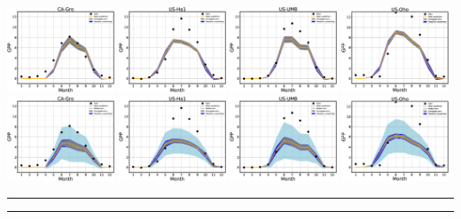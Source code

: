 \begin{center}
\includegraphics[width=0.24\textwidth]{figs_local/fit_CA-Gro.eps}
\includegraphics[width=0.24\textwidth]{figs_local/fit_US-Ha1.eps}
\includegraphics[width=0.24\textwidth]{figs_local/fit_US-UMB.eps}
\includegraphics[width=0.24\textwidth]{figs_local/fit_US-Oho.eps}\\
\includegraphics[width=0.24\textwidth]{figs_local/fit_CA-Gro_merr.eps}
\includegraphics[width=0.24\textwidth]{figs_local/fit_US-Ha1_merr.eps}
\includegraphics[width=0.24\textwidth]{figs_local/fit_US-UMB_merr.eps}
\includegraphics[width=0.24\textwidth]{figs_local/fit_US-Oho_merr.eps}
\end{center}
\bigskip
\hrule
\hrule
\bigskip
\medskip
\vspace*{0.5cm}

